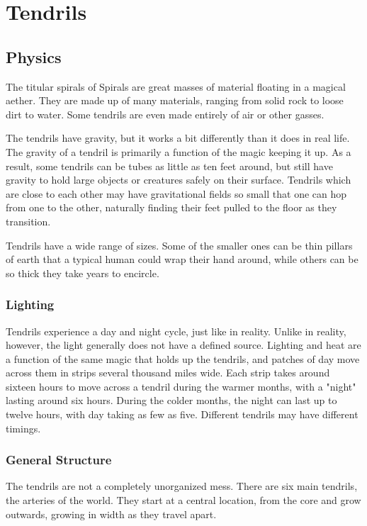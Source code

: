 \chapter{Tendrils}


\begin{multicols*}{2}
\section{Physics}
The titular spirals of Spirals are great masses of material floating in a magical aether.
They are made up of many materials, ranging from solid rock to loose dirt to water.
Some tendrils are even made entirely of air or other gasses.

The tendrils have gravity, but it works a bit differently than it does in real life.
The gravity of a tendril is primarily a function of the magic keeping it up.
As a result, some tendrils can be tubes as little as ten feet around, but still have gravity to hold large objects or creatures safely on their surface.
Tendrils which are close to each other may have gravitational fields so small that one can hop from one to the other, naturally finding their feet pulled to the floor as they transition.

Tendrils have a wide range of sizes. 
Some of the smaller ones can be thin pillars of earth that a typical human could wrap their hand around, while others can be so thick they take years to encircle.

\subsection*{Lighting}
Tendrils experience a day and night cycle, just like in reality.
Unlike in reality, however, the light generally does not have a defined source.
Lighting and heat are a function of the same magic that holds up the tendrils, and patches of day move across them in strips several thousand miles wide.
Each strip takes around sixteen hours to move across a tendril during the warmer months, with a "night" lasting around six hours.
During the colder months, the night can last up to twelve hours, with day taking as few as five.
Different tendrils may have different timings.

\subsection*{General Structure}
The tendrils are not a completely unorganized mess.
There are six main tendrils, the arteries of the world. They start at a central location, from the core and grow outwards, growing in width as they travel apart.


\end{multicols*}
